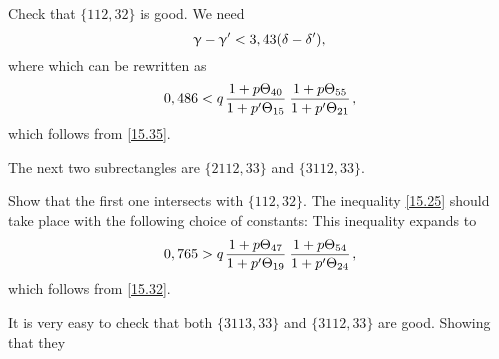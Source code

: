 Check that $\{112, 32\}$ is good. We need
\begin{equation*}
	\upgamma - \upgamma' < 3,43 (\delta - \delta'),
\end{equation*}
where
which can be rewritten as
\begin{equation*}
	0,486 < q \up{40}{15} \up{55}{21},
\end{equation*}
which follows from \ref{15.35}.

The next two subrectangles are $\{2112, 33\}$ and $\{3112, 33\}$.

Show that the first one intersects with $\{112, 32\}$.
The inequality \ref{15.25} should take place with the following choice of constants:
This inequality expands to
\begin{equation*}
	0,765 > q \up{47}{19} \up{54}{24},
\end{equation*}
which follows from \ref{15.32}.

It is very easy to check that both $\{3113, 33\}$ and $\{3112, 33\}$ are good.
Showing that they 
